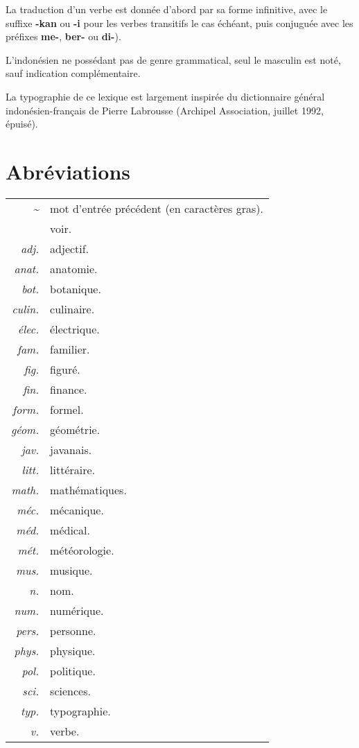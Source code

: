 \documentclass[10pt,twocolumns]{article}
\newcommand{\dt}{\textit{\textasciitilde}} %
\begin{document}
La traduction d'un verbe est donnée d'abord par sa forme infinitive, avec le suffixe \textbf{-kan} ou \textbf{-i} pour les verbes transitifs le cas échéant, puis conjuguée avec les préfixes \textbf{me-}, \textbf{ber-} ou \textbf{di-}).

L'indonésien ne possédant pas de genre grammatical, seul le masculin est noté, sauf indication complémentaire.

La typographie de ce lexique est largement inspirée du dictionnaire général indonésien-français de Pierre Labrousse (Archipel Association, juillet 1992, épuisé).

\section*{Abréviations}
\begin{tabular}{rl}
\dt				&	mot d'entrée précédent (en caractères gras).\\
\rightarrow		&	voir.\\
\textit{adj.}	&	adjectif.\\
\textit{anat.}	&	anatomie.\\
\textit{bot.}	&	botanique.\\
\textit{culin.}	&	culinaire.\\
\textit{élec.}	&	électrique.\\
\textit{fam.}	&	familier.\\
\textit{fig.}	&	figuré.\\
\textit{fin.}	&	finance.\\
\textit{form.}	&	formel.\\
\textit{géom.}	&	géométrie.\\
\textit{jav.}	&	javanais.\\
\textit{litt.}	&	littéraire.\\
\textit{math.}	&	mathématiques.\\
\textit{méc.}	&	mécanique.\\
\textit{méd.}	&	médical.\\
\textit{mét.}	&	météorologie.\\
\textit{mus.}	&	musique.\\
\textit{n.}		&	nom.\\
\textit{num.}	&	numérique.\\
\textit{pers.}	&	personne.\\
\textit{phys.}	&	physique.\\
\textit{pol.}	&	politique.\\
\textit{sci.}	&	sciences.\\
\textit{typ.}	&	typographie.\\
\textit{v.}		&	verbe.\\
\end{tabular}
\end{document}
